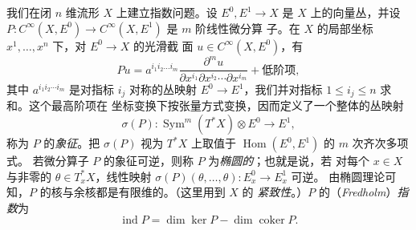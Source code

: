 \documentclass[11pt]{amsart}
\theoremstyle{definition}
\theoremstyle{remark}
\theoremstyle{plain}
\numberwithin{equation}{section}
\renewcommand{\:}{\colon}
\DeclareMathOperator{\Hom}{Hom}
\DeclareMathOperator{\coker}{coker}
\DeclareMathOperator{\ind}{ind}
\DeclareMathOperator{\rank}{rank}
\DeclareMathOperator{\Sym}{Sym}
\begin{document}
我们在闭 $n$ 维流形 $X$ 上建立指数问题。设 $E^0,E^1\to X$ 是 $X$
上的向量丛，并设
$P\:C^{\infty}(X,E^0) \to C^{\infty}(X,E^1)$ 是 $m$ 阶线性微分算
子。在 $X$ 的局部坐标 $x^1,\dots ,x^n$ 下，对 $E^0\to X$ 的光滑截
面 $u\in C^{\infty}(X,E^0)$，有
  \begin{equation}\label{eq:28}
     Pu = a^{i_1i_2\dots i_m} \frac{\partial^mu}{\partial x^{i_1}\partial
     x^{i_2}\cdots \partial x^{i_m}} + \text{低阶项},
  \end{equation}
其中 $a^{i_1i_2\cdots i_m}$ 是对指标 $i_j$ 对称的丛映射
$E^0\to E^1$，我们并对指标 $1\le i_j\le n$ 求和。这个最高阶项在
坐标变换下按张量方式变换，因而定义了一个整体的丛映射
  \begin{equation}\label{eq:29}
     \sigma (P)\: \Sym^m(T^*X) \otimes E^0\longrightarrow E^1,
  \end{equation}
称为 $P$ 的{\it 象征}。把 $\sigma (P)$ 视为 $T^*X$ 上取值于
$\Hom(E^0,E^1)$ 的 $m$ 次齐次多项式。
若微分算子 $P$ 的象征可逆，则称 $P$ 为{\it 椭圆的}；也就是说，若
对每个 $x\in X$ 与非零的 $\theta \in T^*_xX$，线性映射
$\sigma (P)(\theta ,\dots ,\theta )\:E^0_x\to E^1_x$ 可逆。
由椭圆理论可知，$P$ 的核与余核都是有限维的。（这里用到 $X$ 的
\emph{紧致性}。）$P$ 的（\emph{Fredholm}）\emph{指数}为
  \begin{equation}\label{eq:30}
     \ind P = \dim\ker P - \dim\coker P.
  \end{equation}
\end{document}
